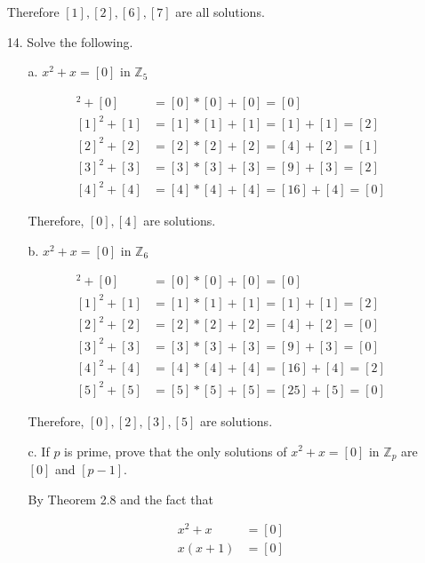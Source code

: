 \documentclass{article}
\begin{document}
\begin{enumerate}
	  		Therefore $[1], [2], [6], [7]$ are all solutions.

		\item [14.] Solve the following.
			\begin{enumerate} 

				\item [a.] $x^2 + x = [0]$ in $\mathbb{Z}_5$

					\begin{align*}
						[0]^2 + [0] & = [0] * [0] + [0] = [0] \\
						[1]^2 + [1] & = [1] * [1] + [1] = [1] + [1] = [2] \\
						[2]^2 + [2] & = [2] * [2] + [2] = [4] + [2] = [1] \\
						[3]^2 + [3] & = [3] * [3] + [3] = [9] + [3] = [2] \\
						[4]^2 + [4] & = [4] * [4] + [4] = [16] + [4] = [0]
					\end{align*}

					Therefore, $[0], [4]$ are solutions.

				\item [b.] $x^2 + x = [0]$ in $\mathbb{Z}_6$

					\begin{align*}
						[0]^2 + [0] & = [0] * [0] + [0] = [0] \\
						[1]^2 + [1] & = [1] * [1] + [1] = [1] + [1] = [2] \\
						[2]^2 + [2] & = [2] * [2] + [2] = [4] + [2] = [0] \\
						[3]^2 + [3] & = [3] * [3] + [3] = [9] + [3] = [0] \\
						[4]^2 + [4] & = [4] * [4] + [4] = [16] + [4] = [2] \\
						[5]^2 + [5] & = [5] * [5] + [5] = [25] + [5] = [0]
					\end{align*}

					Therefore, $[0], [2], [3], [5]$ are solutions.
				\item [c.] If $p$ is prime, prove that the only solutions of $x^2 + x = [0]$ in 
						$\mathbb{Z}_p$ are $[0]$ and $[p - 1]$.

						By Theorem 2.8 and the fact that 

							\begin{align*}
								x^2 + x & = [0] \\
								x(x + 1) & = [0]
							\end{align*}


\end{enumerate}
\end{enumerate}
\end{document}
